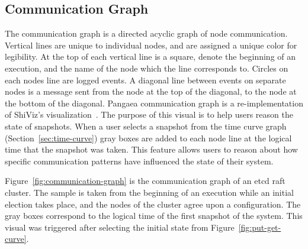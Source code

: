 \subsection{Communication Graph}
\label{sec:communication-graph}

The communication graph is a directed acyclic graph of node
communication. Vertical lines are unique to individual nodes, and are
assigned a unique color for legibility. At the top of each vertical
line is a square, denote the beginning of an execution, and the name
of the node which the line corresponds to. Circles on each nodes line
are logged events. A diagonal line between events on separate nodes is
a message sent from the node at the top of the diagonal, to the node
at the bottom of the diagonal. Pangaea communication graph is a
re-implementation of ShiViz's visualization~\cite{BeschastnikhWBE2016}.
The purpose of this visual is to help users reason the state of
snapshots. When a user selects a snapshot from the time curve graph
(Section~\ref{sec:time-curve}) gray boxes are added to each node line
at the logical time that the snapshot was taken. This feature allows
users to reason about how specific communication patterns have
influenced the state of their system.

Figure~\ref{fig:communication-graph} is the communication graph of an
etcd raft cluster. The sample is taken from the beginning of an
execution while an initial election takes place, and the nodes of the
cluster agree upon a configuration. The gray boxes correspond to the
logical time of the first snapshot of the system. This visual was
triggered after selecting the initial state from
Figure~\ref{fig:put-get-curve}.


